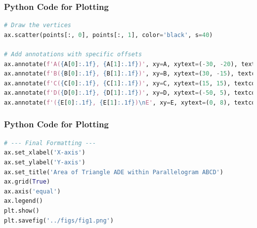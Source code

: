 \documentclass{beamer}
\theoremstyle{remark}
\numberwithin{equation}{section}
\begin{document}
\begin{frame}[fragile]
\frametitle{Python Code for Plotting}
\begin{lstlisting}[language=Python]
# Draw the vertices
ax.scatter(points[:, 0], points[:, 1], color='black', s=40)

# Add annotations with specific offsets
ax.annotate(f'A({A[0]:.1f}, {A[1]:.1f})', xy=A, xytext=(-30, -20), textcoords='offset points')
ax.annotate(f'B({B[0]:.1f}, {B[1]:.1f})', xy=B, xytext=(30, -15), textcoords='offset points')
ax.annotate(f'C({C[0]:.1f}, {C[1]:.1f})', xy=C, xytext=(15, 15), textcoords='offset points')
ax.annotate(f'D({D[0]:.1f}, {D[1]:.1f})', xy=D, xytext=(-50, 5), textcoords='offset points')
ax.annotate(f'({E[0]:.1f}, {E[1]:.1f})\nE', xy=E, xytext=(0, 8), textcoords='offset points', ha='center', va='bottom')
\end{lstlisting}
\end{frame}

\begin{frame}[fragile]
\frametitle{Python Code for Plotting}
\begin{lstlisting}[language=Python]
# --- Final Formatting ---
ax.set_xlabel('X-axis')
ax.set_ylabel('Y-axis')
ax.set_title('Area of Triangle ADE within Parallelogram ABCD')
ax.grid(True)
ax.axis('equal')
ax.legend()
plt.show()
plt.savefig('../figs/fig1.png')
\end{lstlisting}
\end{frame}
\end{document}
